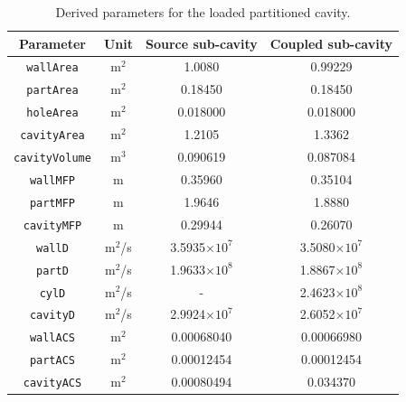 \documentclass[a4paper]{article}
\numberwithin{equation}{section}
\begin{document}
\begin{table}[ht]
\begin{center}
\begin{tabular}{|c|c|c|c|}
\hline
\textbf{Parameter}     &\textbf{Unit} &\textbf{Source sub-cavity} &\textbf{Coupled sub-cavity}\\ 
\hline
\texttt{wallArea}      &m$^2$         &1.0080                     &0.99229             \\
\texttt{partArea}      &m$^2$         &0.18450                    &0.18450             \\
\texttt{holeArea}      &m$^2$         &0.018000                   &0.018000            \\
\texttt{cavityArea}    &m$^2$         &1.2105                     &1.3362              \\
\texttt{cavityVolume}  &m$^3$         &0.090619                   &0.087084            \\
\texttt{wallMFP}       &m             &0.35960                    &0.35104             \\
\texttt{partMFP}       &m             &1.9646                     &1.8880              \\
\texttt{cavityMFP}     &m             &0.29944                    &0.26070             \\
\texttt{wallD}         &m$^2$/s       &3.5935$\times 10^7$        &3.5080$\times 10^7$ \\
\texttt{partD}         &m$^2$/s       &1.9633$\times 10^8$        &1.8867$\times 10^8$ \\
\texttt{cylD}          &m$^2$/s       &-                          &2.4623$\times 10^8$ \\
\texttt{cavityD}       &m$^2$/s       &2.9924$\times 10^7$        &2.6052$\times 10^7$ \\
\texttt{wallACS}       &m$^2$         &0.00068040                 &0.00066980          \\
\texttt{partACS}       &m$^2$         &0.00012454                 &0.00012454          \\
\texttt{cavityACS}     &m$^2$         &0.00080494                 &0.034370            \\
\hline
\end{tabular}
\end{center}
\caption{\label{tb:derivparamdl} Derived parameters for the loaded partitioned cavity.}
\end{table}
\end{document}

